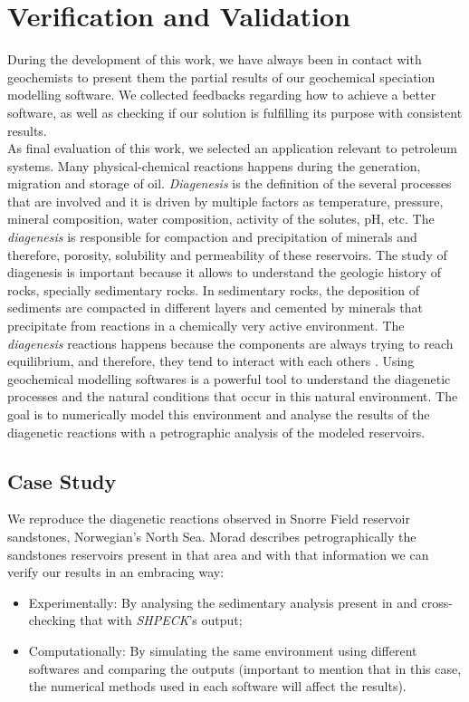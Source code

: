 
\chapter{Verification and Validation}

During the development of this work, we have always been in contact with geochemists to present them the partial results of our geochemical speciation modelling software. We collected feedbacks regarding how to achieve a better software, as well as checking if our solution is fulfilling its purpose with consistent results. \\
As final evaluation of this work, we selected an application relevant to petroleum systems. Many physical-chemical reactions happens during the generation, migration and storage of oil. \emph{Diagenesis} is the definition of the several processes that are involved and it is driven by multiple factors as temperature, pressure, mineral composition, water composition, activity of the solutes, pH, etc. 
The \emph{diagenesis} is responsible for compaction and precipitation of minerals \cite{Tucker:01} and therefore, porosity, solubility and permeability of these reservoirs. The study of diagenesis is important because it allows to understand the geologic history of rocks, specially sedimentary rocks. In sedimentary rocks, the deposition of sediments are compacted in different layers and cemented by minerals that precipitate from reactions in a chemically very active environment. The \emph{diagenesis} reactions happens because the components are always trying to reach equilibrium, and therefore, they tend to interact with each others \cite{Burley:85}.
Using geochemical modelling softwares is a powerful tool to understand the diagenetic processes and the natural conditions that occur in this natural environment. The goal is to numerically model this environment and analyse the results of the diagenetic reactions with a petrographic analysis of the modeled reservoirs.

\section{Case Study}
We reproduce the diagenetic reactions observed in Snorre Field reservoir sandstones, Norwegian's North Sea. Morad \cite{Morad:90} describes petrographically the sandstones reservoirs present in that area and with that information we can verify our results in an embracing way:
\begin{itemize}
\item Experimentally: By analysing the sedimentary analysis present in \cite{Morad:90} and cross-checking that with \emph{SHPECK}'s output;
\item Computationally: By simulating the same environment using different softwares and comparing the outputs (important to mention that in this case, the numerical methods used in each software will affect the results). 
\end{itemize}

